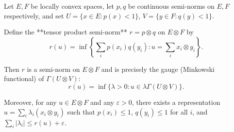 Let $E, F$ be locally convex spaces, let $p, q$ be continuous semi-norms on $E, F$ respectively, and set $U = \{x \in E: p(x) < 1\}$, $V = \{y \in F: q(y) < 1\}$.

Define the **tensor product semi-norm** $r = p \otimes q$ on $E \otimes F$ by
$$r(u) = \inf \left\{ \sum_i p(x_i) q(y_i) : u = \sum_i x_i \otimes y_i \right\}.$$

Then $r$ is a semi-norm on $E \otimes F$ and is precisely the gauge (Minkowski functional) of $\Gamma(U \otimes V)$:
$$r(u) = \inf\{\lambda > 0 : u \in \lambda \Gamma(U \otimes V)\}.$$

Moreover, for any $u \in E \otimes F$ and any $\varepsilon > 0$, there exists a representation $u = \sum_i \lambda_i (x_i \otimes y_i)$ such that $p(x_i) \leq 1$, $q(y_i) \leq 1$ for all $i$, and $\sum_i |\lambda_i| \leq r(u) + \varepsilon$.
